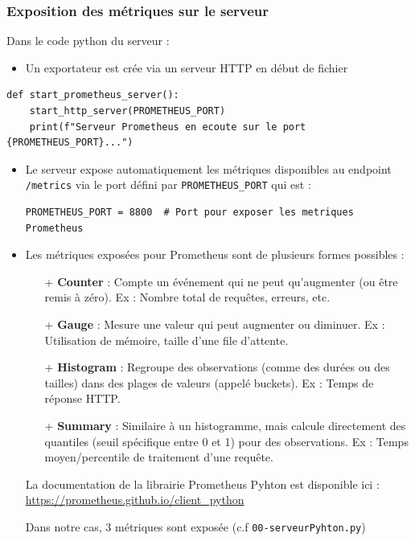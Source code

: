 \documentclass[french, 12pt]{article}%
\newcommand{\itemE}{\item[$\bullet$]}
\begin{document}
\subsubsection{Exposition des métriques sur le serveur}

Dans le code python du serveur : 

\begin{itemize}
\itemE Un exportateur est crée via un serveur HTTP en début de fichier
\end{itemize}

\begin{lstlisting}[style=commande]
def start_prometheus_server():
    start_http_server(PROMETHEUS_PORT)
    print(f"Serveur Prometheus en ecoute sur le port {PROMETHEUS_PORT}...")
\end{lstlisting}


\begin{itemize}
\itemE Le serveur expose automatiquement les métriques disponibles au endpoint \verb?/metrics? via le port défini par \verb?PROMETHEUS_PORT? qui est : 
\begin{lstlisting}[style=commande]
PROMETHEUS_PORT = 8800  # Port pour exposer les metriques Prometheus
\end{lstlisting}



\itemE Les métriques exposées pour Prometheus sont  de plusieurs formes possibles :
	\begin{itemize}
	\item[+] \textbf{Counter} : Compte un événement qui ne peut qu'augmenter (ou être remis à zéro). Ex : Nombre total de requêtes, erreurs, etc.

	\item[+] \textbf{Gauge} : Mesure une valeur qui peut augmenter ou diminuer. Ex : Utilisation de mémoire, taille d'une file d'attente.				

	\item[+] \textbf{Histogram} : Regroupe des observations (comme des durées ou des tailles) dans des plages de valeurs (appelé buckets). Ex : Temps de réponse HTTP.

	\item[+] \textbf{Summary} : Similaire à un histogramme, mais calcule directement des quantiles (seuil spécifique entre 0 et 1) pour des observations. Ex : Temps moyen/percentile de traitement d'une requête.
\end{itemize} 
La documentation de la librairie Prometheus Pyhton est disponible ici : \\

 \href{https://prometheus.github.io/client_python }{https://prometheus.github.io/client\_python }

Dans notre cas, 3 métriques sont exposée (c.f \verb?00-serveurPyhton.py?)
\end{itemize}
\end{document}
